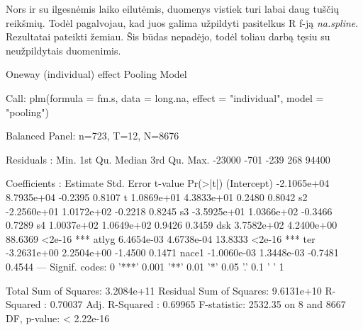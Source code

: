 \documentclass[a4paper]{article}
\newcommand{\R}{R}
\begin{document}
Nors ir su ilgesnėmis laiko eilutėmis, duomenys vistiek turi labai
daug tuščių reikšmių. Todėl pagalvojau, kad juos galima užpildyti
pasitelkus \R{} f-ją \emph{na.spline}. Rezultatai pateikti
žemiau. Šis būdas nepadėjo, todėl toliau darbą tęsiu su neužpildytais duomenimis.
\begin{Schunk}
\begin{Soutput}
Oneway (individual) effect Pooling Model

Call:
plm(formula = fm.s, data = long.na, effect = "individual", model = "pooling")

Balanced Panel: n=723, T=12, N=8676

Residuals :
   Min. 1st Qu.  Median 3rd Qu.    Max. 
 -23000    -701    -239     268   94400 

Coefficients :
               Estimate  Std. Error t-value Pr(>|t|)    
(Intercept) -2.1065e+04  8.7935e+04 -0.2395   0.8107    
t            1.0869e+01  4.3833e+01  0.2480   0.8042    
s2          -2.2560e+01  1.0172e+02 -0.2218   0.8245    
s3          -3.5925e+01  1.0366e+02 -0.3466   0.7289    
s4           1.0037e+02  1.0649e+02  0.9426   0.3459    
dsk          3.7582e+02  4.2400e+00 88.6369   <2e-16 ***
atlyg        6.4654e-03  4.6738e-04 13.8333   <2e-16 ***
ter         -3.2631e+00  2.2504e+00 -1.4500   0.1471    
nace1       -1.0060e-03  1.3448e-03 -0.7481   0.4544    
---
Signif. codes:  0 '***' 0.001 '**' 0.01 '*' 0.05 '.' 0.1 ' ' 1 

Total Sum of Squares:    3.2084e+11
Residual Sum of Squares: 9.6131e+10
R-Squared      :  0.70037 
      Adj. R-Squared :  0.69965 
F-statistic: 2532.35 on 8 and 8667 DF, p-value: < 2.22e-16
\end{Soutput}
\end{Schunk}
\end{document}
